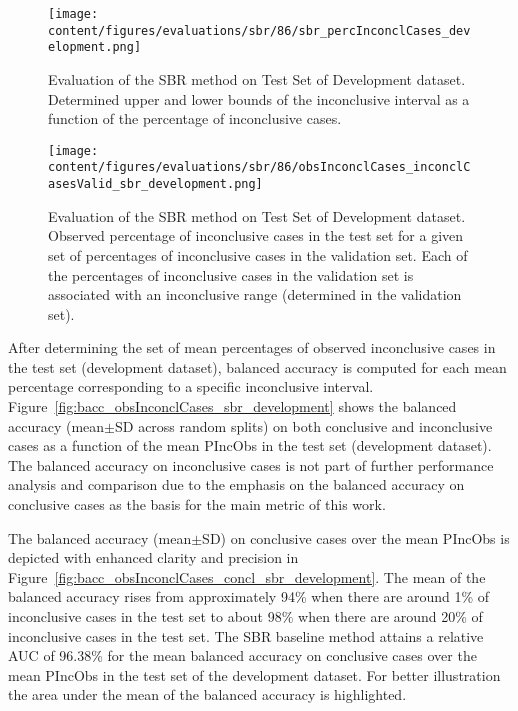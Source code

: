 \begin{figure}[ht]
    \centering
    \texttt{[image: content/figures/evaluations/sbr/86/sbr\_percInconclCases\_development.png]}
    \caption{Evaluation of the SBR method on Test Set of Development dataset. 
    Determined upper and lower bounds of the inconclusive interval as a function of the percentage of inconclusive cases.} 
    \label{fig:sbr_percInconclCases_development}
\end{figure}


\begin{figure}[ht]
    \centering
    \texttt{[image: content/figures/evaluations/sbr/86/obsInconclCases\_inconclCasesValid\_sbr\_development.png]}
    \caption{Evaluation of the SBR method on Test Set of Development dataset.
    Observed percentage of inconclusive cases in the test set 
    for a given set of percentages of inconclusive cases in the validation set.
    Each of the percentages of inconclusive cases in the validation set is associated 
    with an inconclusive range (determined in the validation set).} 
    \label{fig:obsInconclCases_inconclCasesValid_sbr_development}
\end{figure} 


After determining the set of mean percentages of observed inconclusive cases in the test set (development dataset), 
balanced accuracy is computed for each mean percentage corresponding to a specific inconclusive interval.
Figure~\ref{fig:bacc_obsInconclCases_sbr_development} shows the balanced accuracy (mean$\pm$SD across random splits) 
on both conclusive and inconclusive cases as a function of the mean PIncObs
in the test set (development dataset).
The balanced accuracy on inconclusive cases is not part of further performance analysis and comparison 
due to the emphasis on the balanced accuracy on conclusive cases as the basis for the main metric of this work.

The balanced accuracy (mean$\pm$SD) on conclusive cases over the mean PIncObs
is depicted with enhanced clarity and precision in Figure~\ref{fig:bacc_obsInconclCases_concl_sbr_development}.
The mean of the balanced accuracy rises from approximately 94\% 
when there are around 1\% of inconclusive cases in the test set to about 98\% 
when there are around 20\% of inconclusive cases in the test set.
The SBR baseline method attains a relative AUC of 96.38\% for the mean balanced accuracy on conclusive cases
over the mean PIncObs in the test set of the development dataset.
For better illustration the area under the mean of the balanced accuracy is highlighted.

